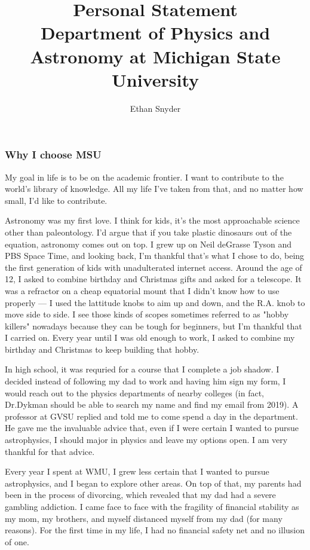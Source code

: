 \documentclass[11pt]{article}
\title{Personal Statement\\
	\large Department of Physics and Astronomy at Michigan State University}
\author{Ethan Snyder}
\begin{document}
\maketitle
\subsubsection*{Why I choose MSU}
My goal in life is to be on the academic frontier. I want to contribute to the world's library of knowledge. All my life I've taken from that, and no matter how small, I'd like to contribute.

Astronomy was my first love. I think for kids, it's the most approachable science other than paleontology. I'd argue that if you take plastic dinosaurs out of the equation, astronomy comes out on top. I grew up on Neil deGrasse Tyson and PBS Space Time, and looking back, I'm thankful that's what I chose to do, being the first generation of kids with unadulterated internet access. Around the age of 12, I asked to combine birthday and Christmas gifts and asked for a telescope. It was a refractor on a cheap equatorial mount that I didn't know how to use properly --- I used the lattitude knobs to aim up and down, and the R.A. knob to move side to side. I see those kinds of scopes sometimes referred to as "hobby killers" nowadays because they can be tough for beginners, but I'm thankful that I carried on. Every year until I was old enough to work, I asked to combine my birthday and Christmas to keep building that hobby.

In high school, it was requried for a course that I complete a job shadow. I decided instead of following my dad to work and having him sign my form, I would reach out to the physics departments of nearby colleges (in fact, Dr.\@ Dykman should be able to search my name and find my email from 2019). A professor at GVSU replied and told me to come spend a day in the department. He gave me the invaluable advice that, even if I were certain I wanted to pursue astrophysics, I should major in physics and leave my options open. I am very thankful for that advice.

Every year I spent at WMU, I grew less certain that I wanted to pursue astrophysics, and I began to explore other areas. On top of that, my parents had been in the process of divorcing, which revealed that my dad had a severe gambling addiction. I came face to face with the fragility of financial stability as my mom, my brothers, and myself distanced myself from my dad (for many reasons). For the first time in my life, I had no financial safety net and no illusion of one.
\end{document}
